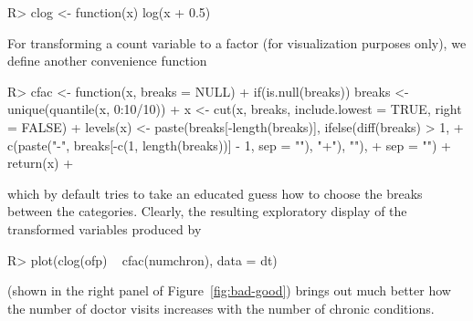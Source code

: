 \documentclass{Z}
\newcommand{\fct}[1]{\code{#1()}}
\begin{document}
\begin{Schunk}
\begin{Sinput}
R> clog <- function(x) log(x + 0.5)
\end{Sinput}
\end{Schunk}

For transforming a count variable to a factor (for visualization purposes only),
we define another convenience function \fct{cfac}

\begin{Schunk}
\begin{Sinput}
R> cfac <- function(x, breaks = NULL) {
+   if(is.null(breaks)) breaks <- unique(quantile(x, 0:10/10))
+   x <- cut(x, breaks, include.lowest = TRUE, right = FALSE)
+   levels(x) <- paste(breaks[-length(breaks)], ifelse(diff(breaks) > 1,
+     c(paste("-", breaks[-c(1, length(breaks))] - 1, sep = ""), "+"), ""),
+     sep = "")
+   return(x)
+ }
\end{Sinput}
\end{Schunk}

which by default tries to take an educated guess how to choose the breaks between the categories.
Clearly, the resulting exploratory display of the transformed variables produced by

\begin{Schunk}
\begin{Sinput}
R> plot(clog(ofp) ~ cfac(numchron), data = dt)
\end{Sinput}
\end{Schunk}

(shown in the right panel of Figure~\ref{fig:bad-good}) brings out much better
how the number of doctor visits increases with the number of chronic conditions.
\end{document}
